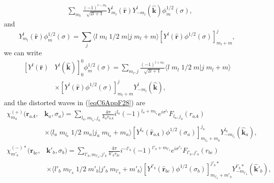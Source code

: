 \begin{subappendices}
\begin{equation}
\begin{split}
&\sum_{m_l} \frac{(-1)^{l-m_l}}{\sqrt{2l+1}} Y^{l}_{m_l} (\hat {\mathbf{r}})Y^{l}_{-m_l} (\hat {\mathbf{k}})\phi^{1/2}_m(\sigma),
 \end{split}
\end{equation}
and
 \begin{equation}\label{eqC6AppG31}
 Y^{l}_{m_l} (\hat {\mathbf{r}})\phi^{1/2}_m(\sigma)=\sum_j \langle l\;m_l\;1/2\;m|j\;m_l+m\rangle \left[ Y^{l} (\hat {\mathbf{r}})\phi^{1/2}(\sigma)\right]^j_{m_l+m},
\end{equation}
we can write
 \begin{equation}\label{eqC6AppG32}
 \begin{split}
\left[ Y^{l} (\hat {\mathbf{r}}) \right. & \left. Y^{l} (\hat {\mathbf{k}})\right]^0_0\phi^{1/2}_m(\sigma)=\sum_{m_l,j} \frac{(-1)^{l+m_l}}{\sqrt{2l+1}} \langle l\;m_l\;1/2\;m|j\;m_l+m\rangle \\
&\times \left[ Y^{l} (\hat {\mathbf{r}})\phi^{1/2}(\sigma)\right]^j_{m_l+m}Y^{l}_{-m_l} (\hat {\mathbf{k}}),
 \end{split}
\end{equation}
and the distorted waves in (\ref{eqC6AppF28}) are
 \begin{equation}\label{eq33}
\begin{split} 
\chi^{(+)}_{m_a}(\mathbf{r}_{aA},&\mathbf{k}_{a},\sigma_a)= \sum_{l_a,m_{l_a},j_a}\frac{4\pi}{k_a r_{aA}} i^{l_a}(-1)^{l_a+m_{l_a}}
e^{i\sigma^{l_a}} F_{l_a,j_a}(r_{aA})\\
 &\times\langle l_a\;m_{l_a}\;1/2\;m_a|j_a\;m_{l_a}+m_a\rangle
 \left[ Y^{l_a} (\hat {\mathbf{r}}_{aA})\phi^{1/2}(\sigma_a)\right]^{j_a}_{m_{l_a}+m_a}Y^{l_a}_{-m_{l_a}} (\hat {\mathbf{k}}_a),
\end{split} 
\end{equation}
 \begin{equation}\label{eqC6AppF34}
\begin{split} 
\chi^{(-)*}_{m'_b}(\mathbf{r}_{bc},&\mathbf{k}'_{b},\sigma_b)= \sum_{l'_b,m_{l'_b},j'_b}\frac{4\pi}{k'_b r_{bc}} i^{-l'_b}(-1)^{l'_b+m_{l'_b}}
e^{i\sigma^{l'_b}} F_{l'_b,j'_b}(r_{bc})\\
 &\times\langle l'_b\;m_{l'_b}\;1/2\;m'_b|j'_b\;m_{l'_b}+m'_b\rangle
 \left[ Y^{l'_b} (\hat {\mathbf{r}}_{bc})\phi^{1/2}(\sigma_b)\right]^{j'_b*}_{m_{l'_b}+m'_b}Y^{l'_b*}_{-m_{l'_b}} (\hat {\mathbf{k}}'_b),
\end{split} 
\end{equation}
 \begin{equation}\label{eqC6AppG35}
\begin{split} 

\end{split}
\end{equation}
\end{subappendices}
